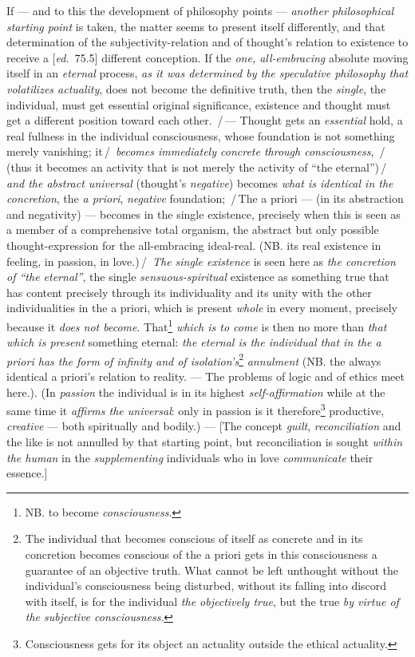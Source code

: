 \documentclass[12pt,a4paper,openany]{book}
\newcommand{\kpage}[1]{\marginnote{\footnotesize\textit{[#1]}}}
\newcommand{\ed}[1]{{\small[\textit{ed.}\ #1]}}
\newcommand{\ins}[1]{\,/\,#1\,/\,}
\begin{document}
If --- and to this the development of philosophy points --- \emph{another
philosophical starting point} is taken, the matter seems to present itself differently, and
that determination of the subjectivity-relation and of thought's relation
to existence to receive a \ed{75.5} different conception. If the
\emph{one, all-embracing} absolute moving itself in an \emph{eternal} process, \emph{as
it was determined by the speculative philosophy that volatilizes actuality}, does not become
the definitive truth, then the \emph{single}, the individual, must get essential
original significance, existence and thought must get a different position toward
each other. \ins{--- Thought gets an \emph{essential} hold, a real fullness in the
\kpage{171}individual consciousness, whose foundation is not something merely vanishing;
it} \emph{becomes immediately concrete through consciousness}, \ins{(thus it becomes
an activity that is not merely the activity of ``the eternal'')} \emph{and the abstract universal}
(thought's \emph{negative}) becomes \emph{what is identical in the concretion}, the \emph{a priori},
\emph{negative} foundation; \ins{The a priori --- (in its abstraction and negativity)
--- becomes in the single existence, precisely when this is seen as
a member of a comprehensive total organism, the abstract but only possible
thought-expression for the all-embracing ideal-real. (NB. its real
existence in feeling, in passion, in love.)} \emph{The single existence}
is seen here as \emph{the concretion of ``the eternal''}, the single \emph{sensuous-spiritual}
existence as something true that has content precisely through its individuality
and its unity with the other individualities in the a priori, which
is present \emph{whole} in every moment, precisely because it \emph{does not become}. That\footnote[125]{NB. to become \emph{consciousness}.} \emph{which is to come}
is then no more than \emph{that which is present} something eternal: \emph{the eternal is the individual
that in the a priori has the form of infinity and of isolation's}\footnote[126]{The individual that becomes conscious of itself as concrete and in its concretion becomes
conscious of the a priori gets in this consciousness a guarantee of an objective truth.
What cannot be left unthought without the individual's consciousness being disturbed,
without its falling into discord with itself, is for the individual \emph{the objectively true}, but the
true \emph{by virtue of the subjective consciousness}.}
\emph{annulment}
(NB. the always identical a priori's relation to reality.
--- The problems of logic and of ethics meet here.). (In \emph{passion} the
individual is in its highest \emph{self-affirmation} while at the same time it \emph{affirms the universal}:
only in passion is it therefore\footnote[127]{Consciousness gets for its object an actuality outside the ethical actuality.} productive, \emph{creative} --- both spiritually
and bodily.) --- [The concept \emph{guilt}, \emph{reconciliation} and the like is not annulled
by that starting point, but reconciliation is sought \emph{within
the human} in the \emph{supplementing} individuals who in love \emph{communicate} their
essence.]
\end{document}
